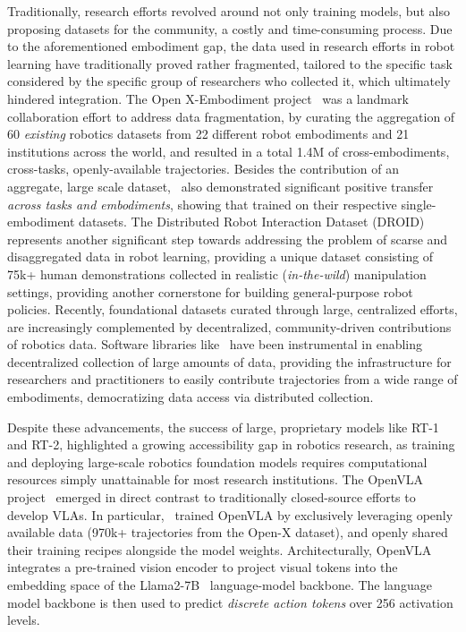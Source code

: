 Traditionally, research efforts revolved around not only training models, but also proposing datasets for the community, a costly and time-consuming process.
Due to the aforementioned embodiment gap, the data used in research efforts in robot learning have traditionally proved rather fragmented, tailored to the specific task considered by the specific group of researchers who collected it, which ultimately hindered integration.
The Open X-Embodiment project~\citep{oneillOpenXEmbodimentRobotic2025} was a landmark collaboration effort to address data fragmentation, by curating the aggregation of 60 \emph{existing} robotics datasets from 22 different robot embodiments and 21 institutions across the world, and resulted in a total 1.4M of cross-embodiments, cross-tasks, openly-available trajectories.
Besides the contribution of an aggregate, large scale dataset,~\citet{oneillOpenXEmbodimentRobotic2025} also demonstrated significant positive transfer \emph{across tasks and embodiments}, showing that  trained on their respective single-embodiment datasets.
The Distributed Robot Interaction Dataset (DROID)~\citep{khazatskyDROIDLargeScaleInTheWild2025} represents another significant step towards addressing the problem of scarse and disaggregated data in robot learning, providing a unique dataset consisting of 75k+ human demonstrations collected in realistic (\emph{in-the-wild}) manipulation settings, providing another cornerstone for building general-purpose robot policies.
Recently, foundational datasets curated through large, centralized efforts, are increasingly complemented by decentralized, community-driven contributions of robotics data.
Software libraries like \lerobot~have been instrumental in enabling decentralized collection of large amounts of data, providing the infrastructure for researchers and practitioners to easily contribute trajectories from a wide range of embodiments, democratizing data access via distributed collection.

Despite these advancements, the success of large, proprietary models like RT-1 and RT-2, highlighted a growing accessibility gap in robotics research, as training and deploying large-scale robotics foundation models requires computational resources simply unattainable for most research institutions. 
The OpenVLA project~\citep{kimOpenVLAOpenSourceVisionLanguageAction2024} emerged in direct contrast to traditionally closed-source efforts to develop VLAs.
In particular,~\citet{kimOpenVLAOpenSourceVisionLanguageAction2024} trained OpenVLA by exclusively leveraging openly available data (970k+ trajectories from the Open-X dataset), and openly shared their training recipes alongside the model weights.
Architecturally, OpenVLA integrates a pre-trained vision encoder to project visual tokens into the embedding space of the Llama2-7B~\citep{touvronLlama2Open2023} language-model backbone.
The language model backbone is then used to predict \emph{discrete action tokens} over 256 activation levels.

